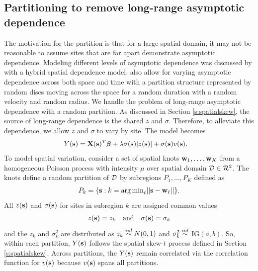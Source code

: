 \documentclass[useAMS,usenatbib,referee]{biom}
\begin{document}
\subsection{Partitioning to remove long-range asymptotic dependence}\label{s:part}
The motivation for the partition is that for a large spatial domain, it may not be reasonable to assume sites that are far apart demonstrate asymptotic dependence.
Modeling different levels of asymptotic dependence was discussed by \citet{Wadsworth2012} with a hybrid spatial dependence model.
\citet{Huser2014} also allow for varying asymptotic dependence across both space and time with a partition structure represented by random discs moving across the space for a random duration with a random velocity and random radius.
We handle the problem of long-range asymptotic dependence with a random partition.
As discussed in Section \ref{s:spatialskew}, the source of long-range dependence is the shared $z$ and $\sigma$.
Therefore, to alleviate this dependence, we allow $z$ and $\sigma$ to vary by site.
The model becomes
\begin{align} \label{eq:partition}
  Y(\bs) &= \bX(\bs)^T \bbeta + \lambda \sigma(\bs) |z(\bs)| + \sigma(\bs) v(\bs).
\end{align}
To model spatial variation, consider a set of spatial knots $\mbox{\bf w}_1, \ldots, \mbox{\bf w}_K$ from a homogeneous Poisson process with intensity $\mu$ over spatial domain $\calD \in \calR^2$.
The knots define a random partition of $\calD$ by subregions $P_{1}, \ldots, P_{K}$ defined as
\begin{align} \label{eq:subregions}
  P_{k} = \{ \bs : k = \argmin_\ell || \bs - \bw_{\ell} || \}.
\end{align}
All $z(\mbox{\bf s})$ and $\sigma(\mbox{\bf s})$ for sites in subregion $k$ are assigned common values
\begin{align}
  z(\bs) = z_{k} \quad \text{and} \quad \sigma(\bs) = \sigma_{k} \label{eq:sitezsig}
\end{align}
and the $z_k$ and $\sigma^2_k$ are distributed as $z_k \stackrel{iid}{\sim} N(0, 1)$ and $\sigma^2_k \stackrel{iid}{\sim}$ IG$(a, b)$.
So, within each partition, $Y(\mbox{\bf s})$ follows the spatial skew-$t$ process defined in Section \ref{s:spatialskew}.
Across partitions, the $Y(\mbox{\bf s})$ remain correlated via the correlation function for $v(\mbox{\bf s})$ because $v(\mbox{\bf s})$ spans all partitions.
\end{document}
